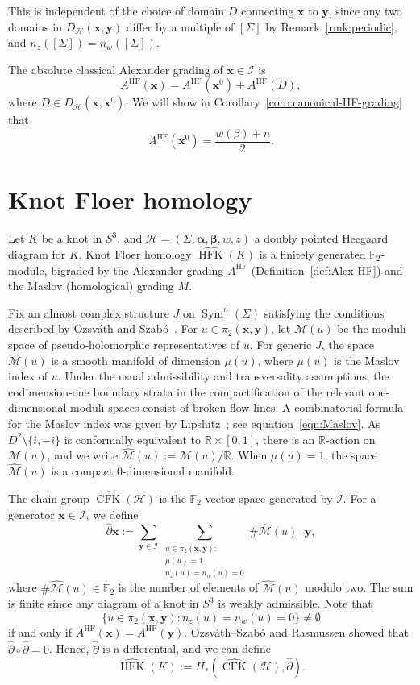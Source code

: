 \documentclass[11pt]{amsart}
\numberwithin{equation}{section}
\numberwithin{figure}{section}
\theoremstyle{definition}
\newcommand{\cH}{\mathcal{H}}
\newcommand{\cI}{\mathcal{I}}
\newcommand{\cM}{\mathcal{M}}
\newcommand{\bF}{\mathbb{F}}
\newcommand{\bR}{\mathbb{R}}
\newcommand{\ph}{\widehat{\partial}}
\DeclareMathOperator{\Sym}{Sym}
\DeclareMathOperator{\CFK}{CFK}
\newcommand{\cMh}{\widehat{\cM}}
\newcommand{\CFKh}{\widehat{\CFK}}
\DeclareMathOperator{\HF}{HF}
\DeclareMathOperator{\HFK}{HFK}
\newcommand{\HFKh}{\widehat{\HFK}}
\newcommand{\as}{\boldsymbol{\alpha}}
\newcommand{\bs}{\boldsymbol{\beta}}
\newcommand{\xs}{\boldsymbol{x}}
\newcommand{\ys}{\boldsymbol{y}}
\begin{document}
This is independent of the choice of domain $D$ connecting $\xs$ to $\ys$, since any two domains in $D_\cH(\xs,\ys)$ differ by a multiple of $[\Sigma]$ by Remark~\ref{rmk:periodic}, and $n_z([\Sigma]) = n_w([\Sigma])$.

The absolute classical Alexander grading of $\xs \in \cI$ is
\[
A^{\HF}(\xs) = A^{\HF}(\xs^0) + A^{\HF}(D),
\]
where $D \in D_{\cH}(\xs, \xs^0)$. We will show in Corollary~\ref{coro:canonical-HF-grading} that
\[
A^{\HF}(\xs^0) = \frac{w(\beta)+n}{2}. 
\]

\section{Knot Floer homology}\label{sec:HFK}

Let $K$ be a knot in $S^3$, and $\cH = (\Sigma,\as,\bs,w,z)$ a doubly pointed Heegaard diagram for $K$. Knot Floer homology $\HFKh(K)$ is a finitely generated $\bF_2$-module, bigraded by the Alexander grading $A^{\HF}$ (Definition~\ref{def:Alex-HF}) and the Maslov (homological) grading $M$. 

Fix an almost complex structure $J$ on $\Sym^n(\Sigma)$ satisfying the conditions described by Ozsv\'ath and Szab\'o~\cite{OS2, OS}. For $u \in \pi_2(\xs,\ys)$, let $\cM(u)$ be the moduli space of pseudo-holomorphic representatives of $u$. For generic $J$, the space $\cM(u)$ is a smooth manifold of dimension $\mu(u)$, where $\mu(u)$ is the Maslov index of $u$. Under the usual admissibility and transversality assumptions, the codimension-one boundary strata in the compactification of the relevant one-dimensional moduli spaces consist of broken flow lines. A combinatorial formula for the Maslov index was given by Lipshitz~\cite{Lipshitz}; see equation~\eqref{eqn:Maslov}. %
As $D^2 \setminus \{i,-i\}$ is conformally equivalent to $\bR \times [0,1]$, there is an $\bR$-action on $\cM(u)$, and we write $\cMh(u) := \cM(u)/\bR$. When $\mu(u) = 1$, the space $\cMh(u)$ is a compact 0-dimensional manifold.

The chain group $\CFKh(\mathscr H)$ is the $\bF_2$-vector space generated by $\cI$. For a generator $\xs \in \cI$, we define
\begin{equation}\label{eqn:HFK-differential}
\ph \xs := \sum_{\ys \in \cI} \sum_{\substack{u \in \pi_2(\xs,\ys):\\ \mu(u)=1 \\ n_z(u) = n_w(u) = 0}} \# \cMh(u) \cdot \ys,
\end{equation}
where $\# \cMh(u) \in \bF_2$ is the number of elements of $\cMh(u)$ modulo two. The sum is finite since any diagram of a knot in $S^3$ is weakly admissible. Note that 
\[
\{u \in \pi_2(\xs,\ys) : n_z(u) = n_w(u) = 0\} \neq \emptyset 
\]
if and only if $A^{\HF}(\xs) = A^{\HF}(\ys)$. Ozsv\'ath--Szab\'o and Rasmussen showed that $\ph \circ \ph = 0$. Hence, $\ph$ is a differential, and we can define
\[
\HFKh(K) := H_*\left(\CFKh(\cH), \ph \right).
\]
\end{document}
